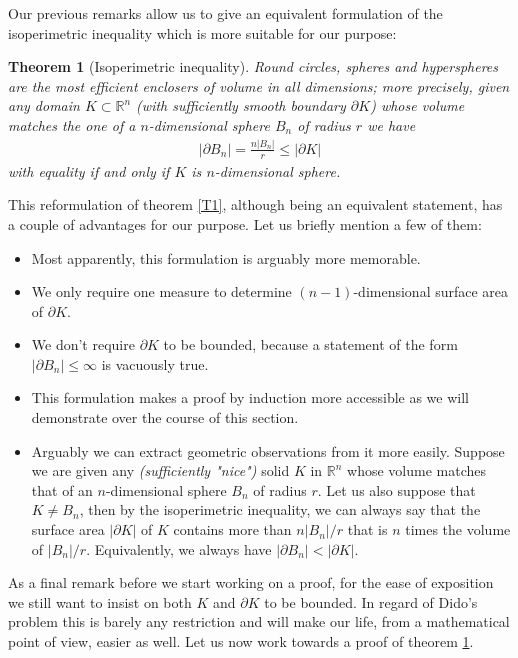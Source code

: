 \documentclass[12pt, a4paper, titlepage]{article}
\newtheorem{thm}{Theorem}
\begin{document}
\newpage
Our previous remarks allow us to give an equivalent formulation of the isoperimetric inequality which is more suitable for our purpose:
\begin{thm}[Isoperimetric inequality] \label{T1Ref} Round circles, spheres and hyperspheres are the most efficient enclosers of volume in all dimensions; more precisely, given any domain $K \subset \mathbb{R}^n$ (with sufficiently smooth boundary $\partial K$) whose volume matches the one of a $n$-dimensional sphere $B_n$ of radius $r$ we have 
\begin{align*}
| \partial B_n|=\frac{n|B_n|}{r} \leq | \partial K|
\end{align*}
with equality if and only if $K$ is $n$-dimensional sphere. 
\end{thm}
This reformulation of theorem \ref{T1}, although being an equivalent statement, has a couple of advantages for our purpose. Let us briefly mention a few of them: 
\begin{itemize}
\item Most apparently, this formulation is arguably more memorable.
\item We only require one measure to determine $(n-1)$-dimensional surface area of $\partial K$. 
\item We don't require $\partial K$ to be bounded, because a statement of the form $| \partial B_n| \leq \infty$ is vacuously true.
\item This formulation makes a proof by induction more accessible as we will demonstrate over the course of this section. 
\item Arguably we can extract geometric observations from it more easily. Suppose we are given any \textit{(sufficiently "nice")} solid $K$ in $\mathbb{R}^n$ whose volume matches that of an $n$-dimensional sphere $B_n$ of radius $r$. Let us also suppose that $K \neq B_n$, then by the isoperimetric inequality, we can always say that the surface area $|\partial K|$ of $K$ contains more than $n|B_n|/r$ that is $n$ times the volume of $|B_n|/r$. Equivalently, we always have $| \partial B_n| < | \partial K|$.
\end{itemize}
As a final remark before we start working on a proof, for the ease of exposition we still want to insist on both $K$ and $\partial K$ to be bounded. In regard of Dido's problem this is barely any restriction and will make our life, from a mathematical point of view, easier as well. 
\newpage
Let us now work towards a proof of theorem \ref{T1Ref}.
\\\\
\end{document}
